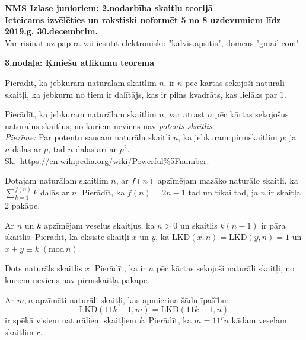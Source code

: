 \documentclass[11pt]{article}
\begin{document}
\begin{center}
{\Large \bf NMS Izlase junioriem: 2.nodarbība skaitļu teorijā}\\
{\bf Ieteicams izvēlēties un rakstiski noformēt 
5 no 8 uzdevumiem līdz 2019.g. 30.decembrim.}\\
{Var risināt uz papīra vai iesūtīt elektroniski: "kalvis.apsitis", domēns "gmail.com"}
\end{center}

\vspace{10pt}
{\bf \large 3.nodaļa: Ķīniešu atlikumu teorēma}

\begin{problem}
Pierādīt, ka jebkuram naturālam skaitlim $n$, ir $n$ pēc kārtas sekojoši 
naturāli skaitļi, ka jebkurm no tiem ir dalītājs, kas ir pilns kvadrāts, kas lielāks par $1$. 
\end{problem}

\begin{problem}
Pierādīt, ka jebkuram naturālam skaitlim $n$, var atrast
$n$ pēc kārtas sekojošus naturālus skaitļus, no kuriem neviens
nav {\em potents skaitlis}.\\
{\em Piezīme:} Par potentu saucam naturālu skaitli $n$, ka jebkuram pirmskaitlim $p$: ja $n$ dalās 
ar $p$, tad $n$ dalās arī ar $p^2$. Sk.\ \url{https://en.wikipedia.org/wiki/Powerful\%5Fnumber}.
\end{problem}

\begin{problem}
Dotajam naturālam skaitlim $n$, ar $f(n)$ apzīmējam mazāko naturālo skaitli, ka 
${\displaystyle \sum\limits_{k=1}^{f(n)} k}$ dalās ar $n$. 
Pierādīt, ka $f(n) = 2n-1$ tad un tikai tad, ja $n$ ir skaitļa $2$ pakāpe.
\end{problem}

\begin{problem}
Ar $n$ un $k$ apzīmējam veselus skaitļus, ka $n>0$ un skaitlis $k(n-1)$ ir pāra skaitlis. 
Pierādīt, ka eksistē skaitļi $x$ un $y$, ka $\text{LKD}(x,n) = \text{LKD}(y,n) = 1$ un 
$x + y \equiv k\;(\text{mod}\,n)$. 
\end{problem}

\begin{problem}
Dots naturāls skaitlis $x$. Pierādīt, ka ir $n$ pēc kārtas sekojoši naturāli skaitļi, 
no kuriem neviens nav pirmskaitļa pakāpe. 
\end{problem}


\begin{problem}
Ar $m, n$ apzīmēti naturāli skaitļi, kas apmierina šādu īpašību:
$$ \text{LKD}(11k-1,m) = \text{LKD}(11k-1,n)$$
ir spēkā visiem naturāliem skaitļiem $k$. Pierādīt, ka $m = 11^rn$ kādam veselam skaitlim $r$. 
\end{problem}
\end{document}
